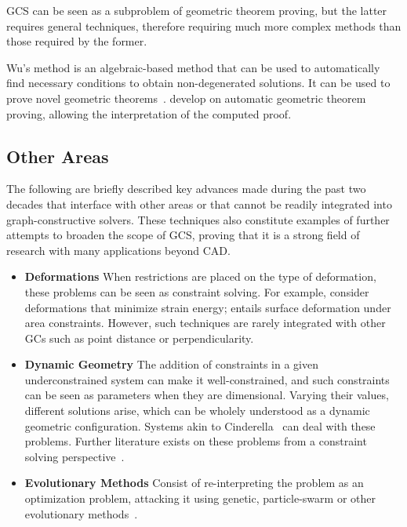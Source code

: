 \ac{GCS} can be seen as a subproblem of geometric theorem proving, but the
latter requires general techniques, therefore requiring much more complex
methods than those required by the former.

Wu's method is an algebraic-based method that can be used to automatically find
necessary conditions to obtain non-degenerated solutions.  It can be used to
prove novel geometric theorems~\cite{Chou:1988:IWMMTPG}.
 develop on automatic geometric
theorem proving, allowing the interpretation of the computed proof.

\subsection{Other Areas}%
\label{sec:intro.constraints.other}

The following are briefly described key advances made during the past two
decades that interface with other areas or that cannot be readily integrated
into graph-constructive solvers.  These techniques also constitute examples of
further attempts to broaden the scope of \ac{GCS}, proving that it is a strong
field of research with many applications beyond \ac{CAD}.

\begin{itemize}
  \item[] \textbf{Deformations} When restrictions are placed on the type of
  deformation, these problems can be seen as constraint solving.  For
  example, \citet{Ahn:2011:LEQBCA,Bao:2010:BIVCMSE,Moll:2006:PPDLO} consider
  deformations that minimize strain energy;  entails
  surface deformation under area constraints.  However, such techniques are
  rarely integrated with other \acp{GC} such as point distance or
  perpendicularity.
  \item[] \textbf{Dynamic Geometry} The addition of constraints in a given
  underconstrained system can make it well-constrained, and such constraints can
  be seen as parameters when they are dimensional.  Varying their values,
  different solutions arise, which can be wholely understood as a dynamic
  geometric configuration.  Systems akin to
  Cinderella~\cite{Richter:2012:Cinderella.2} can deal with these problems.
  Further literature exists on these problems from a constraint solving
  perspective~\cite{Freixas:2010:CDGS}.
  \item[] \textbf{Evolutionary Methods} Consist of re-interpreting the problem
  as an optimization problem, attacking it using genetic, particle-swarm or
  other evolutionary methods~\cite{Chunhong:2006:PDBOEA,Li:2012:HASPSOASGCP}.
\end{itemize}
